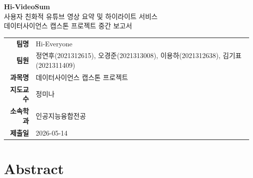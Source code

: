 \documentclass[11pt,a4paper]{article}
\begin{document}
\thispagestyle{empty}

\vspace*{4cm}
\begin{center}
  {\Huge\bfseries Hi-VideoSum}\\[14pt]
  {\LARGE 사용자 친화적 유튜브 영상 요약 및 하이라이트 서비스}\\[24pt]
  {\Large 데이터사이언스 캡스톤 프로젝트 중간 보고서}
\end{center}

\vfill

\begin{center}
\begin{tabular}{rl}
\textbf{팀명}     & Hi-Everyone \\
\textbf{팀원}     & 정연후(2021312615), 오경준(2021313008), 이용하(2021312638), 김기표 (2021311409) \\
\textbf{과목명}   & 데이터사이언스 캡스톤 프로젝트 \\
\textbf{지도교수} & 정미나 \\
\textbf{소속학과} & 인공지능융합전공 \\
\textbf{제출일} & 2026-05-14 \\
\end{tabular}
\end{center}

\vspace{2cm}

\newpage
\setcounter{page}{1}

\section*{Abstract}
\end{document}
